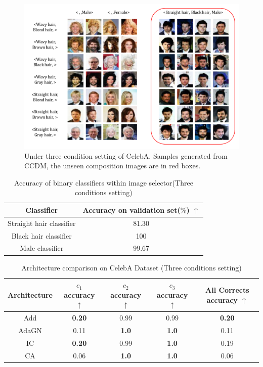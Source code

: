 \begin{figure} [H]
    \centering
    \includegraphics[width=1\linewidth]{figures/CelebA2.pdf}
    \caption{Under three condition setting of CelebA. Samples generated from CCDM, the unseen composition images are in red boxes.}
    \label{fig:sample_11}
\end{figure}

\begin{table} [H]
    \centering
    \begin{tabular}{cc}
         Classifier & Accuracy on validation set($\%$) $\uparrow$ \\
         \hline
         Straight hair classifier & 81.30 \\
         Black hair classifier & 100 \\
         Male classifier & 99.67 \\
    \end{tabular}
    \caption{Accuracy of binary classifiers within image selector(Three conditions setting)}
    \label{CelebABinAccTri}
\end{table}

\begin{table} [H]
    \centering
    \begin{tabular}{ccccc}
         Architecture & $c_1$ accuracy $\uparrow$ & $c_2$ accuracy $\uparrow$ & $c_3$ accuracy $\uparrow$ & All Corrects accuracy $\uparrow$ \\
         \hline
         Add  & \textbf{0.20} & 0.99 & 0.99 & \textbf{0.20}\\
         AdaGN & 0.11 & \textbf{1.0} & \textbf{1.0} & 0.11\\
         IC & \textbf{0.20} & 0.99 & \textbf{1.0} & 0.19\\
         CA & 0.06 & \textbf{1.0} & \textbf{1.0} & 0.06\\
    \end{tabular}
    \caption{Architecture comparison on CelebA Dataset (Three conditions setting)}
    \label{tab:CelebATriAcc}
\end{table}

